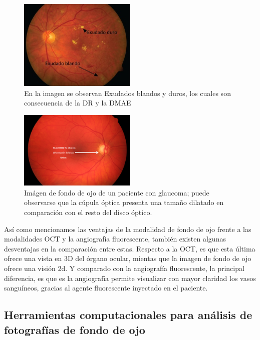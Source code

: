 \begin{figure}[H]
	{
	\centering
	\includegraphics[width=0.5\textwidth]{Figures/Exudados}
	\caption[Exudados]{En la imagen se observan Exudados blandos y duros, los cuales son consecuencia de la DR y la DMAE}
	\label{fig:Exudados blandos o algodonosos y duros}
	}
\end{figure}

\begin{figure}[H]
	{
	\centering
	\includegraphics[width=0.5\textwidth]{Figures/Glaucoma}
	\caption[Glaucoma]{Im\'agen de fondo de ojo de un paciente con glaucoma; puede observarse que la c\'upula \'optica presenta una tama\~no dilatado en comparaci\'on con el resto del disco \'optico.}
	\label{fig:Ojo afectado por Glaucoma.}
	}
\end{figure}

As\'i como mencionamos las ventajas de la modalidad de fondo de ojo frente a las modalidades OCT y la angiograf\'ia fluorescente, tambi\'en existen algunas desventajas en la comparaci\'on entre estas. Respecto a la OCT, es que esta \'ultima ofrece una vista en 3D del \'organo ocular, mientas que la imagen de fondo de ojo ofrece una visi\'on 2d. Y comparado con la angiograf\'ia fluorescente, la principal diferencia, es que es la angiograf\'ia permite visualizar con mayor claridad los vasos sangu\'ineos, gracias al agente fluorescente inyectado en el paciente.

\subsection{Herramientas computacionales para an\'alisis de fotograf\'ias de fondo de ojo}

